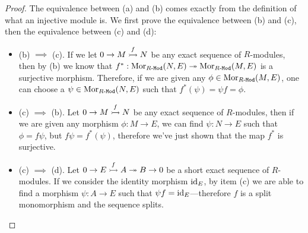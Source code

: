 \begin{proof}
    The equivalence between (a) and (b) comes exactly from the definition of
    what an injective module is. We first prove the equivalence between (b) and (c),
    then the equivalence between (c) and (d):
    \begin{itemize}\setlength\itemsep{0em}
        \item (b) \(\implies\) (c). If we let \(0 \to M \overset{f}{\rightarrowtail} N\) be any
              exact sequence of \(R\)-modules, then by (b) we know that
              \(f^{*}: \operatorname{Mor}_{{R\text{-}\texttt{Mod}}}(N, E) \twoheadrightarrow \operatorname{Mor}_{{R\text{-}\texttt{Mod}}}(M, E)\) is a surjective
              morphism. Therefore, if we are given any \(\phi \in \operatorname{Mor}_{{R\text{-}\texttt{Mod}}}(M, E)\),
              one can choose a \(\psi \in \operatorname{Mor}_{{R\text{-}\texttt{Mod}}}(N, E)\) such that
              \(f^{*}(\psi) = \psi f = \phi\).

        \item (c) \(\implies\) (b). Let \(0 \to M \overset{f}{\rightarrowtail} N\) be any exact
              sequence of \(R\)-modules, then if we are given any morphism
              \(\phi: M \to E\), we can find \(\psi: N \to E\) such that \(\phi = f \psi\),
              but \(f \psi = f^{*}(\psi)\), therefore we've just shown that the map
              \(f^{*}\) is surjective.

        \item (c) \(\implies\) (d). Let \(0 \to E \overset f {\rightarrowtail} A \twoheadrightarrow B \to 0\) be
              a short exact sequence of \(R\)-modules. If we consider the identity morphism
              \(\operatorname{id}_E\), by item (c) we are able to find a morphism \(\psi: A \to E\) such
              that \(\psi f = \operatorname{id}_E\)---therefore \(f\) is a split monomorphism and the
              sequence splits.


\end{itemize}
\end{proof}
